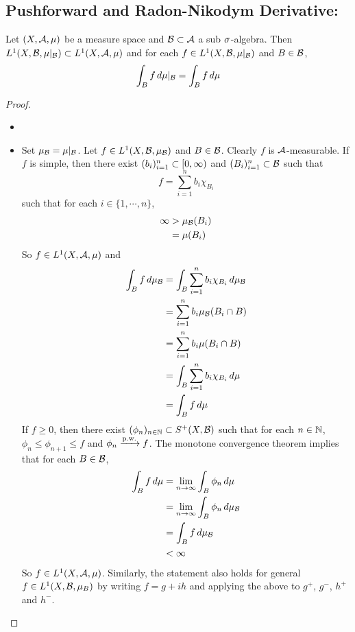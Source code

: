 \documentclass{book}
\begin{document}
	\subsection{Pushforward and Radon-Nikodym Derivative:}
	
	\begin{ex}  
		Let $(X, \mathcal{A}, \mu)$ be a measure space and $\mathcal{B} \subset \mathcal{A}$ a sub $\sigma$-algebra. Then $ L^1(X, \mathcal{B}, \mu|_{\mathcal{B}}) \subset L^1(X, \mathcal{A}, \mu)$ and for each $f \in L^1(X, \mathcal{B}, \mu|_{\mathcal{B}})$ and $B \in \mathcal{B}$, 
		$$\int_B f \, d \mu|_{\mathcal{B}} = \int_B f \, d \mu$$
	\end{ex}
	
	\begin{proof}\
		\begin{itemize}
			\item {}
			\item Set $\mu_{\mathcal{B}} = \mu|_{\mathcal{B}}$. Let $f \in L^1(X, \mathcal{B}, \mu_{\mathcal{B}})$ and $B \in \mathcal{B}$. Clearly $f$ is $\mathcal{A}$-measurable. If $f$ is simple, then there exist $(b_i)_{i=1}^n \subset [0,\infty)$ and $(B_i)_{i=1}^n \subset \mathcal{B}$ such that $$f = \sum_{i=1}^n b_i \chi_{B_i}$$ such that for each $i \in \{1, \cdots, n\}$, 
			\begin{align*}
				\infty 
				&> \mu_{\mathcal{B}}(B_i) \\
				&= \mu(B_i)
			\end{align*}
			So $f \in L^1(X, \mathcal{A}, \mu)$ and 
			\begin{align*}
				\int_B f \, d \mu_{\mathcal{B}} 
				&= \int_B \sum_{i=1}^n b_i \chi_{B_i} \, d \mu_{\mathcal{B}} \\
				&= \sum_{i=1}^n b_i \mu_{\mathcal{B}}(B_i \cap B)\\
				&= \sum_{i=1}^n b_i \mu(B_i \cap B)\\
				&= \int_B \sum_{i=1}^n b_i\chi_{B_i} \, d \mu \\
				&= \int_B f \, d \mu
			\end{align*}
			If $f \geq 0$, then there exist $(\phi_n)_{n \in \mathbb{N}} \subset S^+(X, \mathcal{B})$ such that for each $n \in \mathbb{N}$, $\phi_n \leq \phi_{n+1} \leq f$ and $\phi_n \xrightarrow{\text{p.w.}} f$. The monotone convergence theorem implies that for each $B \in \mathcal{B}$,
			\begin{align*}
				\int_B f \, d \mu
				&= \lim \limits_{n \rightarrow \infty} \int_B \phi_n \, d \mu \\
				&= \lim \limits_{n \rightarrow \infty} \int_B \phi_n \, d \mu_{\mathcal{B}} \\
				& = \int_B f \, d \mu_{\mathcal{B}} \\
				& < \infty
			\end{align*}
			So $f \in L^1(X, \mathcal{A}, \mu)$.
			Similarly, the statement also holds for general $f \in L^1(X, \mathcal{B}, \mu_B)$ by writing $f = g+ih$ and applying the above to $g^+$, $g^-$, $h^+$ and $h^-$.
		\end{itemize}
	\end{proof}
	
\end{document}

